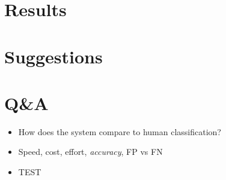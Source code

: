 \documentclass{beamer}
\begin{document}
\section{Results}
\section{Suggestions}
\section{Q\&A}
\begin{frame}
  \begin{itemize}
	    \item How does the system compare to human classification?
	    \item Speed, cost, effort, \emph{accuracy}, FP vs FN
	    \item TEST
  \end{itemize}
\end{frame}
\end{document}
